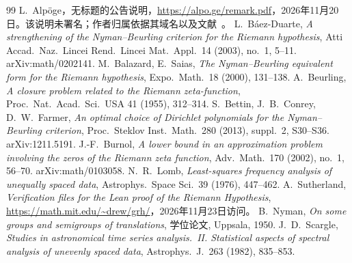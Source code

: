 \documentclass[11pt,a4paper]{amsart}
\theoremstyle{definition}
\theoremstyle{remark}
\begin{document}
\begin{thebibliography}{99}
 L.~Alp\"oge，无标题的公告说明，\url{https://alpo.ge/remark.pdf}，2026年11月20日。该说明未署名；作者归属依据其域名以及文献~\cite{MIT}。
 L.~B\'aez-Duarte, \emph{A strengthening of the Nyman--Beurling criterion for the Riemann hypothesis}, Atti Accad.\ Naz.\ Lincei Rend.\ Lincei Mat.\ Appl.\ 14 (2003), no.~1, 5--11. arXiv:math/0202141.
 M.~Balazard, E.~Saias, \emph{The Nyman--Beurling equivalent form for the Riemann hypothesis}, Expo.\ Math.\ 18 (2000), 131--138.
 A.~Beurling, \emph{A closure problem related to the Riemann zeta-function}, Proc.\ Nat.\ Acad.\ Sci.\ USA 41 (1955), 312--314.
 S.~Bettin, J.~B.~Conrey, D.~W.~Farmer, \emph{An optimal choice of Dirichlet polynomials for the Nyman--Beurling criterion}, Proc.\ Steklov Inst.\ Math.\ 280 (2013), suppl.~2, S30--S36. arXiv:1211.5191.
 J.-F.~Burnol, \emph{A lower bound in an approximation problem involving the zeros of the Riemann zeta function}, Adv.\ Math.\ 170 (2002), no.~1, 56--70. arXiv:math/0103058.
 N.~R.~Lomb, \emph{Least-squares frequency analysis of unequally spaced data}, Astrophys.\ Space Sci.\ 39 (1976), 447--462.
 A.~Sutherland, \emph{Verification files for the Lean proof of the Riemann Hypothesis}, \url{https://math.mit.edu/~drew/grh/}，2026年11月23日访问。
 B.~Nyman, \emph{On some groups and semigroups of translations}, 学位论文, Uppsala, 1950.
 J.~D.~Scargle, \emph{Studies in astronomical time series analysis.~II. Statistical aspects of spectral analysis of unevenly spaced data}, Astrophys.\ J.\ 263 (1982), 835--853.
\end{thebibliography}
\end{document}
